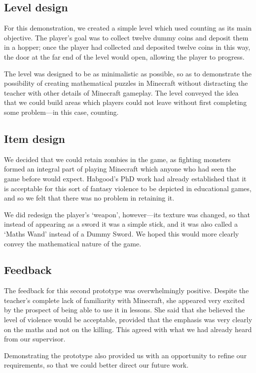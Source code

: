 \subsection{Level design}
For this demonstration, we created a simple level which used counting
as its main objective. The player's goal was to collect twelve
dummy coins and deposit them in a hopper; once the player had collected
and deposited twelve coins in this way, the door at the far end of the level
would open, allowing the player to progress.

The level was designed to be as minimalistic as possible, so as to 
demonstrate the possibility of creating mathematical puzzles in Minecraft
without distracting the teacher with other details of Minecraft gameplay.
The level conveyed the idea that we could build areas which players could not 
leave without first completing some problem---in this case, counting.

\subsection{Item design}
We decided that we could retain zombies in the game, as fighting monsters
formed an integral part of playing Minecraft which anyone who had seen the
game before would expect. Habgood's PhD work had already established that
it is acceptable for this sort of fantasy violence to be depicted in
educational games\cite{habgood2007}, and so we felt that there was no
problem in retaining it.

We did redesign the player's `weapon', however---its texture was changed,
so that instead of appearing as a sword it was a simple stick, and it was
also called a `Maths Wand' instead of a Dummy Sword. We hoped this would
more clearly convey the mathematical nature of the game.

\subsection{Feedback}
The feedback for this second prototype was overwhelmingly positive. Despite
the teacher's complete lack of familiarity with Minecraft, she appeared
very excited by the prospect of being able to use it in lessons. She said
that she believed the level of violence would be acceptable, provided that
the emphasis was very clearly on the maths and not on the killing. This agreed
with what we had already heard from our supervisor.

Demonstrating the prototype also provided us with an opportunity to refine
our requirements, so that we could better direct our future work.
